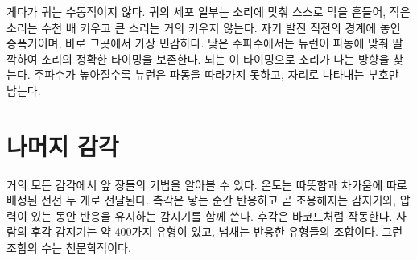 
게다가 귀는 수동적이지 않다. 귀의 세포 일부는 소리에 맞춰 스스로 막을 흔들어, 작은 소리는 수천 배 키우고 큰 소리는 거의 키우지 않는다. 자기 발진 직전의 경계에 놓인 증폭기이며, 바로 그곳에서 가장 민감하다. 낮은 주파수에서는 뉴런이 파동에 맞춰 딸깍하여 소리의 정확한 타이밍을 보존한다. 뇌는 이 타이밍으로 소리가 나는 방향을 찾는다. 주파수가 높아질수록 뉴런은 파동을 따라가지 못하고, 자리로 나타내는 부호만 남는다.

\section*{나머지 감각}

거의 모든 감각에서 앞 장들의 기법을 알아볼 수 있다. 온도는 따뜻함과 차가움에 따로 배정된 전선 두 개로 전달된다. 촉각은 닿는 순간 반응하고 곧 조용해지는 감지기와, 압력이 있는 동안 반응을 유지하는 감지기를 함께 쓴다. 후각은 바코드처럼 작동한다. 사람의 후각 감지기는 약 400가지 유형이 있고, 냄새는 반응한 유형들의 조합이다. 그런 조합의 수는 천문학적이다.

